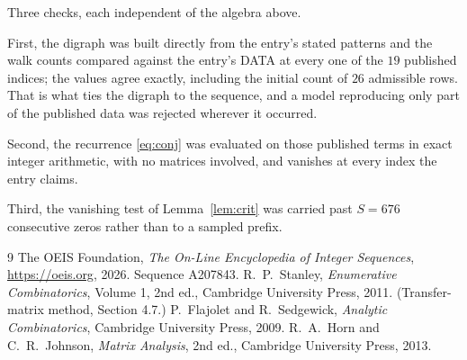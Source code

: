 \documentclass[11pt,a4paper]{article}
\theoremstyle{plain}
\theoremstyle{definition}
\begin{document}
Three checks, each independent of the algebra above.

First, the digraph was built directly from the entry's stated patterns and the walk counts
compared against the entry's DATA at every one of the $19$ published indices; the
values agree exactly, including the initial count of $26$ admissible rows. That is
what ties the digraph to the sequence, and a model reproducing only part of the published
data was rejected wherever it occurred.

Second, the recurrence \eqref{eq:conj} was evaluated on those published terms in exact
integer arithmetic, with no matrices involved, and vanishes at every index the entry claims.

Third, the vanishing test of Lemma~\ref{lem:crit} was carried past $S=676$ consecutive
zeros rather than to a sampled prefix.

\begin{thebibliography}{9}
 The OEIS Foundation, \emph{The On-Line Encyclopedia of Integer
Sequences}, \url{https://oeis.org}, 2026. Sequence A207843.
 R.~P.~Stanley, \emph{Enumerative Combinatorics}, Volume 1, 2nd ed.,
Cambridge University Press, 2011. (Transfer-matrix method, Section 4.7.)
 P.~Flajolet and R.~Sedgewick, \emph{Analytic Combinatorics}, Cambridge
University Press, 2009.
 R.~A.~Horn and C.~R.~Johnson, \emph{Matrix Analysis}, 2nd ed., Cambridge
University Press, 2013.
\end{thebibliography}
\end{document}

